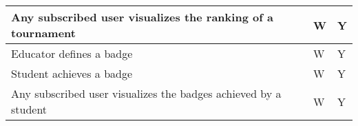 \begin{center}
\begin{longtable}{|p{8.7cm}|p{3cm}|p{3cm}|}
        Any subscribed user visualizes the ranking of a tournament                                                                            & W                      & Y               \\ \hline
        Educator defines a badge                                                                                                              & W                      & Y               \\ \hline
        Student achieves a badge                                                                                                              & W                      & Y               \\ \hline
        Any subscribed user visualizes the badges achieved by a student                                                                       & W                      & Y               \\ \hline
    \end{longtable}
\end{center}